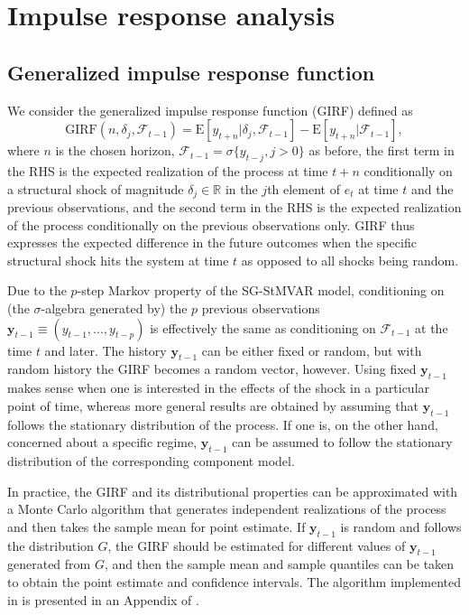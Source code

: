 \documentclass[nojss]{jss} %
\begin{document}
\section{Impulse response analysis}\label{sec:impulseresponse}

\subsection{Generalized impulse response function}
We consider the generalized impulse response function (GIRF) \citep{Koop+Pesaran+Potter:1996} defined as
\begin{equation}\label{eq:girf}
\text{GIRF}(n,\delta_j,\mathcal{F}_{t-1}) = \text{E}[y_{t+n}|\delta_j,\mathcal{F}_{t-1}] - \text{E}[y_{t+n}|\mathcal{F}_{t-1}],
\end{equation}
where $n$ is the chosen horizon, $\mathcal{F}_{t-1}=\sigma\lbrace y_{t-j},j>0\rbrace$ as before, the first term in the RHS is the expected realization of the process at time $t+n$ conditionally on a structural shock of magnitude $\delta_j \in\mathbb{R}$ in the $j$th element of $e_t$ at time $t$ and the previous observations, and the second term in the RHS is the expected realization of the process conditionally on the previous observations only. GIRF thus expresses the expected difference in the future outcomes when the specific structural shock hits the system at time $t$ as opposed to all shocks being random.

Due to the $p$-step Markov property of the SG-StMVAR model, conditioning on (the $\sigma$-algebra generated by) the $p$ previous observations $\boldsymbol{y}_{t-1}\equiv(y_{t-1},...,y_{t-p})$ is effectively the same as conditioning on $\mathcal{F}_{t-1}$ at the time $t$ and later. The history $\boldsymbol{y}_{t-1}$ can be either fixed or random, but with random history the GIRF becomes a random vector, however. Using fixed $\boldsymbol{y}_{t-1}$ makes sense when one is interested in the effects of the shock in a particular point of time, whereas more general results are obtained by assuming that $\boldsymbol{y}_{t-1}$ follows the stationary distribution of the process. If one is, on the other hand, concerned about a specific regime, $\boldsymbol{y}_{t-1}$ can be assumed to follow the stationary distribution of the corresponding component model.

In practice, the GIRF and its distributional properties can be approximated with a Monte Carlo algorithm that generates independent realizations of the process and then takes the sample mean for point estimate. If $\boldsymbol{y}_{t-1}$ is random and follows the distribution $G$, the GIRF should be estimated for different values of $\boldsymbol{y}_{t-1}$ generated from $G$, and then the sample mean and sample quantiles can be taken to obtain the point estimate and confidence intervals. The algorithm implemented in  is presented in an Appendix of \cite{Virolainen:2020}.
\end{document}
